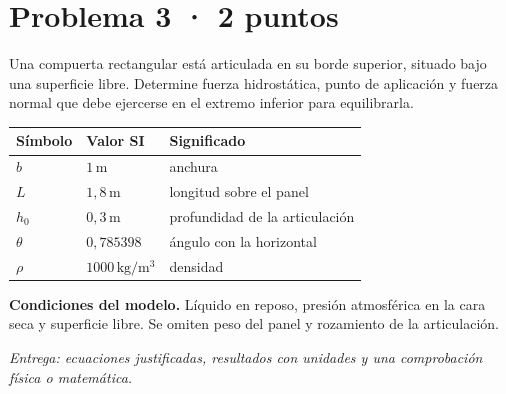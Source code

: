 \par\medskip\noindent\begin{minipage}{\linewidth}

\section{Problema 3 · 2 puntos}

Una compuerta rectangular está articulada en su borde superior, situado bajo una superficie libre. Determine fuerza hidrostática, punto de aplicación y fuerza normal que debe ejercerse en el extremo inferior para equilibrarla.

\begin{tabular}{@{}p{.15\linewidth}p{.23\linewidth}p{.54\linewidth}@{}}
\toprule Símbolo & Valor SI & Significado\\\midrule
$b$ & $1\,\mathrm{m}$ & anchura\\
$L$ & $1{,}8\,\mathrm{m}$ & longitud sobre el panel\\
$h_0$ & $0{,}3\,\mathrm{m}$ & profundidad de la articulación\\
$\theta$ & $0{,}785398$ & ángulo con la horizontal\\
$\rho$ & $1000\,\mathrm{kg/m^3}$ & densidad\\
\bottomrule\end{tabular}

\par\medskip\textbf{Condiciones del modelo.} Líquido en reposo, presión atmosférica en la cara seca y superficie libre. Se omiten peso del panel y rozamiento de la articulación.

\par\textit{Entrega: ecuaciones justificadas, resultados con unidades y una comprobación física o matemática.}

\end{minipage}\par\medskip

